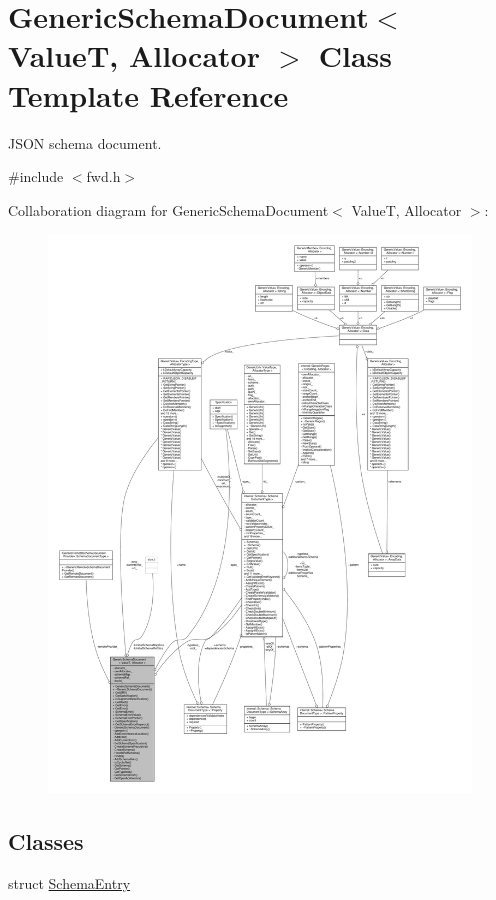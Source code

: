 \hypertarget{classGenericSchemaDocument}{}\section{Generic\+Schema\+Document$<$ ValueT, Allocator $>$ Class Template Reference}
\label{classGenericSchemaDocument}


J\+S\+ON schema document.  




{\ttfamily \#include $<$fwd.\+h$>$}



Collaboration diagram for Generic\+Schema\+Document$<$ ValueT, Allocator $>$\+:
\nopagebreak
\begin{figure}[H]
\begin{center}
\leavevmode
\includegraphics[width=350pt]{classGenericSchemaDocument__coll__graph}
\end{center}
\end{figure}
\subsection*{Classes}
\begin{DoxyCompactItemize}
\item 
struct \hyperlink{structGenericSchemaDocument_1_1SchemaEntry}{Schema\+Entry}
\end{DoxyCompactItemize}
